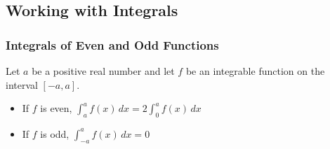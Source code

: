 %
%
%

\subsection{Working with Integrals}
\subsubsection{Integrals of Even and Odd Functions}
Let $a$ be a positive real number and let $f$ be an integrable function on the interval $[-a, a]$.

\begin{itemize}
    \item If $f$ is even, $\int _a ^a f(x)\, dx = 2 \int _0 ^a f(x)\, dx$
    \item If $f$ is odd, $\int _{-a} ^a f(x)\, dx = 0$
\end{itemize}



